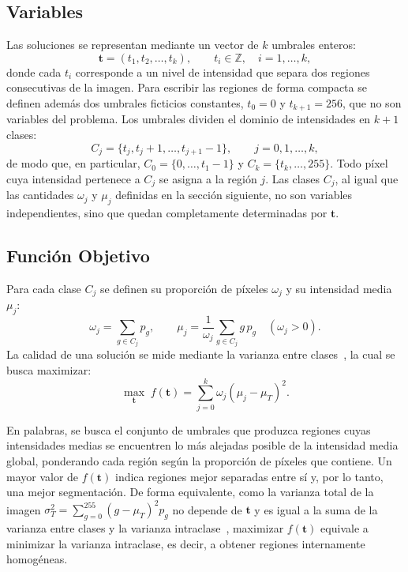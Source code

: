 \documentclass[letter, 10pt]{article}
\begin{document}
\subsection{Variables}
Las soluciones se representan mediante un vector de $k$ umbrales enteros:
\begin{equation}
    \mathbf{t} = (t_1, t_2, \dots, t_k), \qquad t_i \in \mathbb{Z}, \quad i = 1, \dots, k,
\end{equation}
donde cada $t_i$ corresponde a un nivel de intensidad que separa dos regiones consecutivas de la imagen. Para escribir las regiones de forma compacta se definen adem\'as dos umbrales ficticios constantes, $t_0 = 0$ y $t_{k+1} = 256$, que no son variables del problema. Los umbrales dividen el dominio de intensidades en $k+1$ clases:
\begin{equation}
    C_j = \{t_j, t_j + 1, \dots, t_{j+1} - 1\}, \qquad j = 0, 1, \dots, k,
\end{equation}
de modo que, en particular, $C_0 = \{0, \dots, t_1 - 1\}$ y $C_k = \{t_k, \dots, 255\}$. Todo p\'ixel cuya intensidad pertenece a $C_j$ se asigna a la regi\'on $j$. Las clases $C_j$, al igual que las cantidades $\omega_j$ y $\mu_j$ definidas en la secci\'on siguiente, no son variables independientes, sino que quedan completamente determinadas por $\mathbf{t}$.

\subsection{Funci\'on Objetivo}
Para cada clase $C_j$ se definen su proporci\'on de p\'ixeles $\omega_j$ y su intensidad media $\mu_j$:
\begin{equation}
    \omega_j = \sum_{g \in C_j} p_g, \qquad
    \mu_j = \frac{1}{\omega_j} \sum_{g \in C_j} g\, p_g \quad (\omega_j > 0).
\end{equation}
La calidad de una soluci\'on se mide mediante la varianza entre clases~\cite{Otsu1979}, la cual se busca maximizar:
\begin{equation}
    \max_{\mathbf{t}} \; f(\mathbf{t}) = \sum_{j=0}^{k} \omega_j \left( \mu_j - \mu_T \right)^2 .
    \label{eq:otsu}
\end{equation}

En palabras, se busca el conjunto de umbrales que produzca regiones cuyas intensidades medias se encuentren lo m\'as alejadas posible de la intensidad media global, ponderando cada regi\'on seg\'un la proporci\'on de p\'ixeles que contiene. Un mayor valor de $f(\mathbf{t})$ indica regiones mejor separadas entre s\'i y, por lo tanto, una mejor segmentaci\'on. De forma equivalente, como la varianza total de la imagen $\sigma_T^2 = \sum_{g=0}^{255} (g - \mu_T)^2 p_g$ no depende de $\mathbf{t}$ y es igual a la suma de la varianza entre clases y la varianza intraclase~\cite{Otsu1979}, maximizar $f(\mathbf{t})$ equivale a minimizar la varianza intraclase, es decir, a obtener regiones internamente homog\'eneas.
\end{document}
